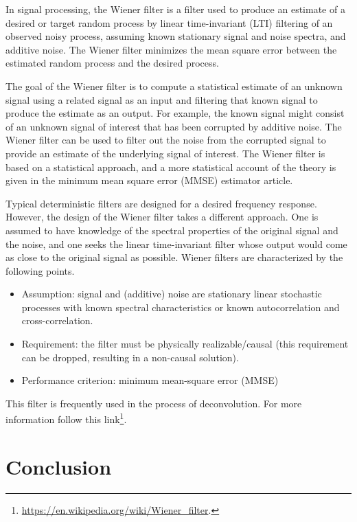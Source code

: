 \documentclass[12pt]{article}
\theoremstyle{plain}
\begin{document}
In signal processing, the Wiener filter is a filter used to produce an estimate of a desired or target random process by linear time-invariant (LTI) filtering of an observed noisy process, assuming known stationary signal and noise spectra, and additive noise. The Wiener filter minimizes the mean square error between the estimated random process and the desired process.

The goal of the Wiener filter is to compute a statistical estimate of an unknown signal using a related signal as an input and filtering that known signal to produce the estimate as an output. For example, the known signal might consist of an unknown signal of interest that has been corrupted by additive noise. The Wiener filter can be used to filter out the noise from the corrupted signal to provide an estimate of the underlying signal of interest. The Wiener filter is based on a statistical approach, and a more statistical account of the theory is given in the minimum mean square error (MMSE) estimator article.

Typical deterministic filters are designed for a desired frequency response. However, the design of the Wiener filter takes a different approach. One is assumed to have knowledge of the spectral properties of the original signal and the noise, and one seeks the linear time-invariant filter whose output would come as close to the original signal as possible. Wiener filters are characterized by the following points.

\begin{itemize}
	\item Assumption: signal and (additive) noise are stationary linear stochastic processes with known spectral characteristics or known autocorrelation and cross-correlation.
	\item Requirement: the filter must be physically realizable/causal (this requirement can be dropped, resulting in a non-causal solution).
	\item Performance criterion: minimum mean-square error (MMSE)
\end{itemize}

This filter is frequently used in the process of deconvolution. For more information follow this link\footnote{\url{https://en.wikipedia.org/wiki/Wiener_filter}.}.

\section{Conclusion}
\end{document}
